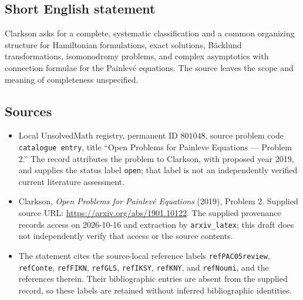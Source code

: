 \documentclass[11pt]{article}
\begin{document}
\subsection{Short English statement}
Clarkson asks for a complete, systematic classification and a common organizing structure for Hamiltonian formulations, exact solutions, B\"acklund transformations, isomonodromy problems, and complex asymptotics with connection formulae for the Painlev\'e equations. The source leaves the scope and meaning of completeness unspecified.
\subsection{Sources}
\begin{itemize}
\item Local UnsolvedMath registry, permanent ID \(801048\), source problem code \texttt{catalogue entry}, title ``Open Problems for Painleve Equations --- Problem 2.'' The record attributes the problem to Clarkson, with proposed year 2019, and supplies the status label \texttt{open}; that label is not an independently verified current literature assessment.
\item Clarkson, \emph{Open Problems for Painlev\'e Equations} (2019), Problem 2. Supplied source URL: \url{https://arxiv.org/abs/1901.10122}. The supplied provenance records access on 2026-10-16 and extraction by \texttt{arxiv\_latex}; this draft does not independently verify that access or the source contents.
\item The statement cites the source-local reference labels \texttt{refPAC05review}, \texttt{refConte}, \texttt{refFIKN}, \texttt{refGLS}, \texttt{refIKSY}, \texttt{refKNY}, and \texttt{refNoumi}, and the references therein. Their bibliographic entries are absent from the supplied record, so these labels are retained without inferred bibliographic identities.
\end{itemize}
\end{document}
